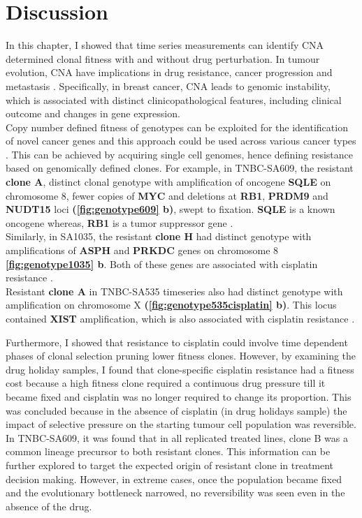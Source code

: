 \section{Discussion}

 In this chapter, I showed that time series measurements can identify CNA determined clonal fitness with and without drug perturbation. In tumour evolution, CNA have implications in drug resistance, cancer progression and metastasis \cite{ bielski2018genome, beroukhim2010landscape}. Specifically, in breast cancer, CNA leads to genomic instability, which is associated with distinct clinicopathological features, including clinical outcome and changes in gene expression.
 \\
 Copy number defined fitness of genotypes can be exploited for the identification of novel cancer genes and this approach could be used across various cancer types \cite{lopez2020interplay}. This can be achieved by acquiring single cell genomes, hence defining resistance based on genomically defined clones.
  For example, in TNBC-SA609, the resistant \textbf{clone A}, distinct clonal genotype with amplification of oncogene \textbf{SQLE} on chromosome 8, fewer copies of \textbf{MYC} and deletions at \textbf{RB1}, \textbf{PRDM9} and \textbf{NUDT15} loci \textbf{(\autoref{fig:genotype609} b)}, swept to fixation. \textbf{SQLE} is a known oncogene \cite{brown2016squalene} whereas, \textbf{RB1} is a tumor suppressor gene \cite{dyson2016rb1}.
\\
Similarly, in SA1035, the resistant \textbf{clone H} had distinct genotype with amplifications of \textbf{ASPH} and \textbf{PRKDC} genes on chromosome 8 \textbf{\autoref{fig:genotype1035} b}. Both of these genes are associated with cisplatin resistance \cite{solar2011differentially, zhou2020inhibiting}.
\\
Resistant \textbf{clone A} in TNBC-SA535 timeseries also had distinct genotype with amplification on chromosome X \textbf{(\autoref{fig:genotype535cisplatin} b)}. This locus contained \textbf{XIST} amplification, which is also associated with cisplatin resistance \cite{tian2019upregulation}.


 Furthermore, I showed that resistance to cisplatin could involve time dependent phases of clonal selection pruning lower fitness clones. However, by examining the drug holiday samples, I found that clone-specific cisplatin resistance had a fitness cost because a high fitness clone required a continuous drug pressure till it became fixed and cisplatin was no longer required to change its proportion.
 This was concluded because in the absence of cisplatin (in drug holidays sample) the impact of selective pressure on the starting tumour cell population was reversible. 
 In TNBC-SA609, it was found that in all replicated treated lines, clone B was  a common lineage precursor to both resistant clones. This information can be further explored to target the expected origin of resistant clone in treatment decision making.
However, in extreme cases, once the population became fixed and the evolutionary bottleneck narrowed, no reversibility was seen even in the absence of the drug.  

